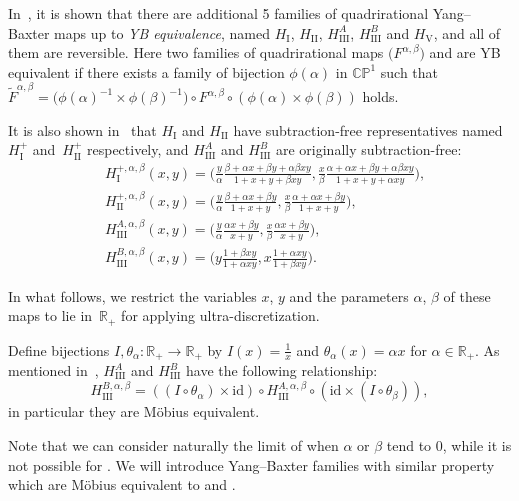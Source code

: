 \documentclass[pdftex]{sigma}
\numberwithin{equation}{section}
\def\R{\mathbb{R}}
\def\id{\mathrm{id}}
\begin{document}
In~\cite{PSTV}, it is shown that there are additional 5
families of quadrirational Yang--Baxter maps up to
{\it YB equivalence}, named $H_{\mathrm{I}}$, $H_{\mathrm{II}}$, $H_{\mathrm{III}}^A$,
$H_{\mathrm{III}}^B$ and $H_{\mathrm{V}}$, and all of them are reversible.
Here two families of quadrirational maps
$\bigl(F^{\alpha,\beta}\bigr)$ and  are
YB equivalent if there exists a family of bijection
$\phi(\alpha)$ in $\mathbb{CP}^1$ such that
$\tilde{F}^{\alpha,\beta}=
\bigl(\phi(\alpha)^{-1}\times\phi(\beta)^{-1}\bigr)\circ F^{\alpha,\beta}\circ(\phi(\alpha)\times\phi(\beta))$ holds.

It is also shown in~\cite{PSTV} that $H_{\mathrm{I}}$ and $H_{\mathrm{II}}$ have subtraction-free representatives named $H_{\mathrm{I}}^+$ and~$H_{\mathrm{II}}^+$ respectively,
and $H_{\mathrm{III}}^A$ and $H_{\mathrm{III}}^B$ are originally subtraction-free:
\begin{align*}
&H_{\mathrm{I}}^{+,\alpha,\beta}(x,y)=\biggl(\frac{y}{\alpha}\frac{\beta+\alpha x+\beta y+\alpha\beta xy}{1+x+y+\beta xy},\frac{x}{\beta}\frac{\alpha+\alpha x+\beta y+\alpha\beta xy}{1+x+y+\alpha xy}\biggr),\\
&H_{\mathrm{II}}^{+,\alpha,\beta}(x,y)=\biggl(\frac{y}{\alpha}\frac{\beta+\alpha x+\beta y}{1+x+y},\frac{x}{\beta}\frac{\alpha+\alpha x+\beta y}{1+x+y}\biggr),\\
&H_{\mathrm{III}}^{A,\alpha,\beta}(x,y)=\biggl(\frac{y}{\alpha}\frac{\alpha x+\beta y}{x+y},
\frac{x}{\beta}\frac{\alpha x+\beta y}{x+y}\biggr),\\
&H_{\mathrm{III}}^{B,\alpha,\beta}(x,y)=\biggl(y\frac{1+\beta xy}{1+\alpha xy},x\frac{1+\alpha xy}{1+\beta xy}\biggr).
\end{align*}

In what follows, we restrict the variables $x$, $y$ and
the parameters $\alpha$, $\beta$ of these maps to lie in~$\R_+$
for applying ultra-discretization.

Define bijections $I,\theta_{\alpha}\colon\R_+\to\R_+$ by $I(x)=\frac1x$ and
$\theta_{\alpha}(x)=\alpha x$ for $\alpha\in\R_+$.
As mentioned in~\cite{SU},
$H_{\mathrm{III}}^A$ and $H_{\mathrm{III}}^B$ have the following relationship:
\[
H_{\mathrm{III}}^{B,\alpha,\beta}=((I\circ\theta_{\alpha})\times\id)
\circ H_{\mathrm{III}}^{A,\alpha,\beta}\circ(\id\times(I\circ\theta_{\beta})),
\]
in particular they are M\"{o}bius equivalent.

Note that we can consider naturally the limit of  when
$\alpha$ or $\beta$ tend to 0, while it is not possible for .
We will introduce Yang--Baxter families
with similar property
which are M\"{o}bius equivalent to  and
.
\end{document}
